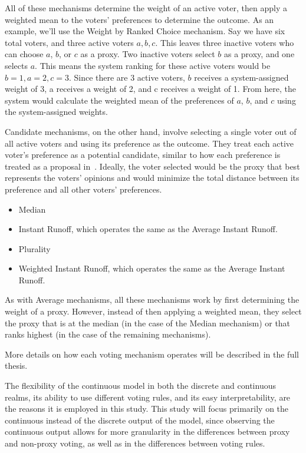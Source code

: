All of these mechanisms determine the weight of an active voter, then apply a
weighted mean to the voters' preferences to determine the outcome.
As an example, we'll use the Weight by Ranked Choice mechanism.
Say we have six total voters, and three active voters $a, b, c$.
This leaves three inactive voters who can choose $a$, $b$, or $c$ as a proxy.
Two inactive voters select $b$ as a proxy, and one selects $a$.
This means the system ranking for these active voters would be $b = 1, a = 2, c = 3$.
Since there are 3 active voters, $b$ receives a system-assigned weight of 3, a
receives a weight of 2, and c receives a weight of 1.
From here, the system would calculate the weighted mean of the preferences of $a$,
$b$, and $c$ using the system-assigned weights.

Candidate mechanisms, on the other hand, involve selecting a single voter out of all
active voters and using its preference as the outcome.
They treat each active voter's preference as a potential candidate, similar to how
each preference is treated as a proposal in~\cite{Bulteau2021}.
Ideally, the voter selected would be the proxy that best represents the voters' opinions
and would minimize the total distance between its preference and all other voters'
preferences.
\begin{itemize}
    \item Median
    \item Instant Runoff, which operates the same as the Average Instant Runoff.
    \item Plurality
    \item Weighted Instant Runoff, which operates the same as the Average Instant
    Runoff.
\end{itemize}
As with Average mechanisms, all these mechanisms work by first determining the weight
of a proxy.
However, instead of then applying a weighted mean, they select the proxy that is
at the median (in the case of the Median mechanism) or that ranks highest (in the case
of the remaining mechanisms).

More details on how each voting mechanism operates will be described in the full thesis.

The flexibility of the continuous model in both the discrete and continuous realms, its
ability to use different voting rules, and its easy interpretability, are the reasons
it is employed in this study.
This study will focus primarily on the continuous instead of the discrete output of
the model, since observing the continuous output allows for more granularity in the
differences between proxy and non-proxy voting, as well as in the differences between
voting rules.

